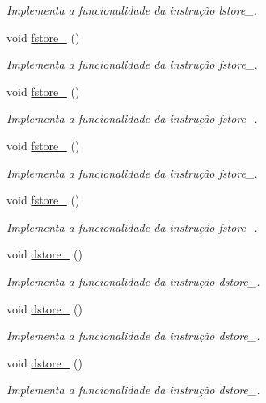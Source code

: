 \begin{DoxyCompactItemize}
\begin{DoxyCompactList}\small\item\em Implementa a funcionalidade da instrução lstore\+\_. \end{DoxyCompactList}\item 
void \hyperlink{classOperations_a7465534bbf4e4ca9f0493a8dbe645d46}{fstore\+\_} ()
\begin{DoxyCompactList}\small\item\em Implementa a funcionalidade da instrução fstore\+\_. \end{DoxyCompactList}\item 
void \hyperlink{classOperations_a2ea876acd29db9eec798302229bfd5e5}{fstore\+\_} ()
\begin{DoxyCompactList}\small\item\em Implementa a funcionalidade da instrução fstore\+\_. \end{DoxyCompactList}\item 
void \hyperlink{classOperations_a6d0a2faa9f164d49accf491a95364e2f}{fstore\+\_} ()
\begin{DoxyCompactList}\small\item\em Implementa a funcionalidade da instrução fstore\+\_. \end{DoxyCompactList}\item 
void \hyperlink{classOperations_a00786621697e0e6e6c084c3cee1599ae}{fstore\+\_} ()
\begin{DoxyCompactList}\small\item\em Implementa a funcionalidade da instrução fstore\+\_. \end{DoxyCompactList}\item 
void \hyperlink{classOperations_a54dd25692395f6671a3a8e21c73eef6d}{dstore\+\_} ()
\begin{DoxyCompactList}\small\item\em Implementa a funcionalidade da instrução dstore\+\_. \end{DoxyCompactList}\item 
void \hyperlink{classOperations_a5f12c99fca34f123522a6c1461782e5f}{dstore\+\_} ()
\begin{DoxyCompactList}\small\item\em Implementa a funcionalidade da instrução dstore\+\_. \end{DoxyCompactList}\item 
void \hyperlink{classOperations_ad0f97963e6eb2482f5032fdb3465ec94}{dstore\+\_} ()
\begin{DoxyCompactList}\small\item\em Implementa a funcionalidade da instrução dstore\+\_. \end{DoxyCompactList}\item 

\end{DoxyCompactItemize}
